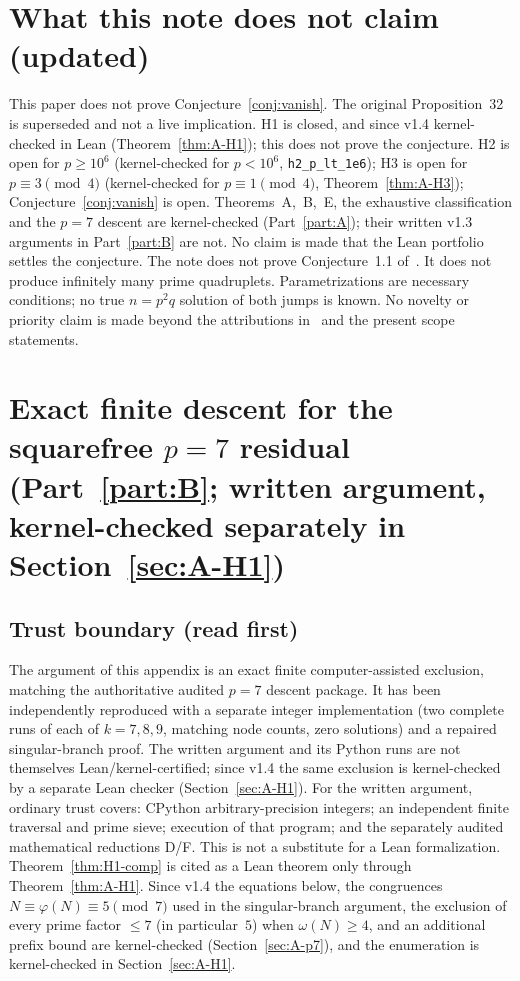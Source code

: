 \documentclass[11pt,reqno]{amsart}
\newcommand{\ph}{\varphi}
\theoremstyle{definition}
\begin{document}
\section*{What this note does not claim (updated)}
\label{sec:noclaim-v011}

This paper does not prove Conjecture~\ref{conj:vanish}. The original Proposition~32 is superseded and not a live implication. H1 is closed, and since v1.4 kernel-checked in Lean (Theorem~\ref{thm:A-H1}); this does not prove the conjecture. H2 is open for \(p\ge 10^6\) (kernel-checked for \(p<10^6\), \texttt{h2\_p\_lt\_1e6}); H3 is open for \(p\equiv 3\pmod 4\) (kernel-checked for \(p\equiv 1\pmod 4\), Theorem~\ref{thm:A-H3}); Conjecture~\ref{conj:vanish} is open. Theorems~A,~B,~E, the exhaustive classification and the \(p=7\) descent are kernel-checked (Part~\ref{part:A}); their written v1.3 arguments in Part~\ref{part:B} are not. No claim is made that the Lean portfolio settles the conjecture. The note does not prove Conjecture~1.1 of~\cite{RCW2026}. It does not produce infinitely many prime quadruplets. Parametrizations are necessary conditions; no true \(n=p^2q\) solution of both jumps is known. No novelty or priority claim is made beyond the attributions in~\cite{RCW2026} and the present scope statements.


\appendix

\section{Exact finite descent for the squarefree \(p=7\) residual (Part~\ref{part:B}; written argument, kernel-checked separately in Section~\ref{sec:A-H1})}
\label{app:p7}

\subsection{Trust boundary (read first)}
\label{app:p7-trust}
The argument of this appendix is an exact finite computer-assisted exclusion, matching the authoritative audited \(p=7\) descent package. It has been independently reproduced with a separate integer implementation (two complete runs of each of \(k=7,8,9\), matching node counts, zero solutions) and a repaired singular-branch proof. The written argument and its Python runs are not themselves Lean/kernel-certified; since v1.4 the same exclusion is kernel-checked by a separate Lean checker (Section~\ref{sec:A-H1}). For the written argument, ordinary trust covers: CPython arbitrary-precision integers; an independent finite traversal and prime sieve; execution of that program; and the separately audited mathematical reductions D/F. This is not a substitute for a Lean formalization. Theorem~\ref{thm:H1-comp} is cited as a Lean theorem only through Theorem~\ref{thm:A-H1}. Since v1.4 the equations below, the congruences \(N\equiv\ph(N)\equiv 5\pmod 7\) used in the singular-branch argument, the exclusion of every prime factor \(\le 7\) (in particular~\(5\)) when \(\omega(N)\ge 4\), and an additional prefix bound are kernel-checked (Section~\ref{sec:A-p7}), and the enumeration is kernel-checked in Section~\ref{sec:A-H1}.
\end{document}
